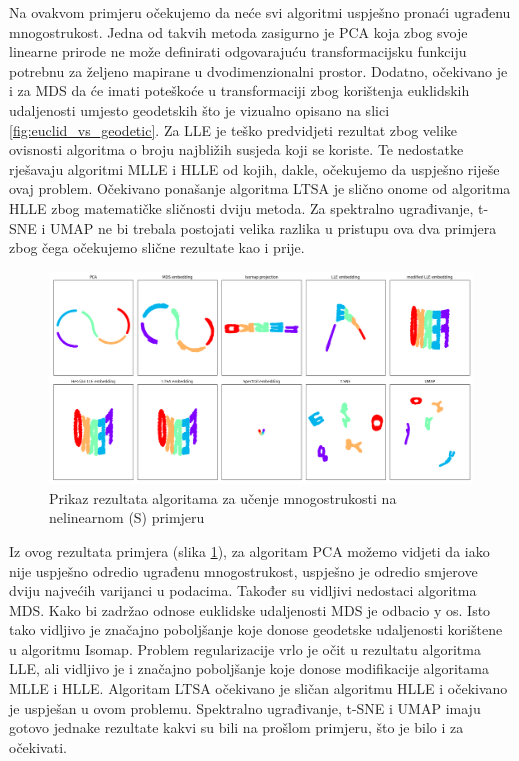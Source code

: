 \documentclass[times, utf8, diplomski]{fer}
\begin{document}
\bigskip
Na ovakvom primjeru očekujemo da neće svi algoritmi uspješno pronaći ugrađenu mnogostrukost. Jedna od takvih metoda zasigurno je PCA koja zbog svoje linearne prirode ne može definirati odgovarajuću transformacijsku funkciju potrebnu za željeno mapirane u dvodimenzionalni prostor. Dodatno, očekivano je i za MDS da će imati poteškoće u transformaciji zbog korištenja euklidskih udaljenosti umjesto geodetskih što je vizualno opisano na slici \ref{fig:euclid_vs_geodetic}. Za LLE je teško predvidjeti rezultat zbog velike ovisnosti algoritma o broju najbližih susjeda koji se koriste. Te nedostatke rješavaju algoritmi MLLE i HLLE od kojih, dakle, očekujemo da uspješno riješe ovaj problem. Očekivano ponašanje algoritma LTSA je slično onome od algoritma HLLE zbog matematičke sličnosti dviju metoda. Za spektralno ugrađivanje, t-SNE i UMAP ne bi trebala postojati velika razlika u pristupu ova dva primjera zbog čega očekujemo slične rezultate kao i prije.

\begin{figure}[htb]
    \centering
    \includegraphics[width=\textwidth]{resources/images/reduction/compare/xs.png}
    \caption{Prikaz rezultata algoritama za učenje mnogostrukosti na nelinearnom (S) primjeru}
    \label{fig:xs}
\end{figure}

Iz ovog rezultata primjera (slika \ref{fig:xs}), za algoritam PCA možemo vidjeti da iako nije uspješno odredio ugrađenu mnogostrukost, uspješno je odredio smjerove dviju najvećih varijanci u podacima. Također su vidljivi nedostaci algoritma MDS. Kako bi zadržao odnose euklidske udaljenosti MDS je odbacio y os. Isto tako vidljivo je značajno poboljšanje koje donose geodetske udaljenosti korištene u algoritmu Isomap. Problem regularizacije vrlo je očit u rezultatu algoritma LLE, ali vidljivo je i značajno poboljšanje koje donose modifikacije algoritama MLLE i HLLE. Algoritam LTSA očekivano je sličan algoritmu HLLE i očekivano je uspješan u ovom problemu. Spektralno ugrađivanje, t-SNE i UMAP imaju gotovo jednake rezultate kakvi su bili na prošlom primjeru, što je bilo i za očekivati.
\end{document}
